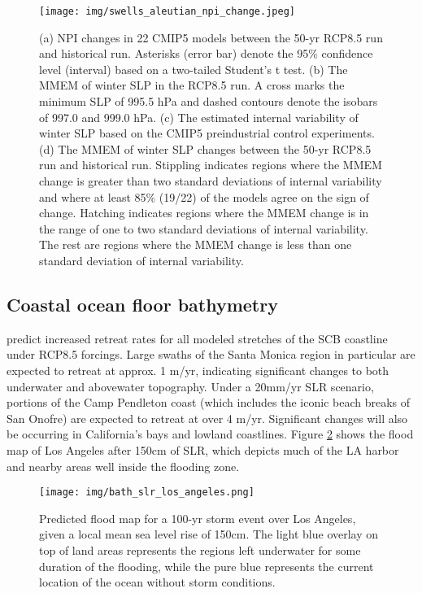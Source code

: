 \documentclass[12pt, letterpaper]{article}
\begin{document}
	\begin{figure}[h]
		\centering
		\texttt{[image: img/swells\_aleutian\_npi\_change.jpeg]}
		\caption{
		(a) NPI changes in 22 CMIP5 models between the 50-yr RCP8.5 run and historical run. Asterisks (error bar) denote the 95\% confidence level (interval) based on a two-tailed Student’s t test. (b) The MMEM of winter SLP in the RCP8.5 run. A cross marks the minimum SLP of 995.5 hPa and dashed contours denote the isobars of 997.0 and 999.0 hPa. (c) The estimated internal variability of winter SLP based on the CMIP5 preindustrial control experiments. (d) The MMEM of winter SLP changes between the 50-yr RCP8.5 run and historical run. Stippling indicates regions where the MMEM change is greater than two standard deviations of internal variability and where at least 85\% (19/22) of the models agree on the sign of change. Hatching indicates regions where the MMEM change is in the range of one to two standard deviations of internal variability. The rest are regions where the MMEM change is less than one standard deviation of internal variability. \citep{swells-aleutian-low}}
		\label{fig:aleutian_npi_change}
	\end{figure}

	\subsection{Coastal ocean floor bathymetry}
	\citeauthor{bath-cosmos} predict increased retreat rates for all modeled stretches of the SCB coastline under RCP8.5 forcings. Large swaths of the Santa Monica region in particular are expected to retreat at approx. 1 m/yr, indicating significant changes to both underwater and abovewater topography. Under a 20mm/yr SLR scenario, portions of the Camp Pendleton coast (which includes the iconic beach breaks of San Onofre) are expected to retreat at over 4 m/yr.
	Significant changes will also be occurring in California's bays and lowland coastlines. Figure \ref{fig:slr_los_angeles} shows the flood map of Los Angeles after 150cm of SLR, which depicts much of the LA harbor and nearby areas well inside the flooding zone. \citep{bath-cosmos}

	\begin{figure}[h]
		\centering
		\texttt{[image: img/bath\_slr\_los\_angeles.png]}
		\caption{Predicted flood map for a 100-yr storm event over Los Angeles, given a local mean sea level rise of 150cm. The light blue overlay on top of land areas represents the regions left underwater for some duration of the flooding, while the pure blue represents the current location of the ocean without storm conditions.\citep{bath-cosmos}}
		\label{fig:slr_los_angeles}
	\end{figure}
\end{document}
